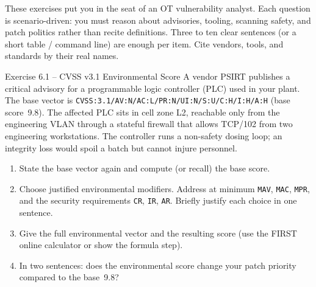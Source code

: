 \documentclass[11pt,a4paper]{article}
\begin{document}
\sheetheader

\noindent These exercises put you in the seat of an OT vulnerability analyst.
Each question is scenario-driven: you must reason about advisories, tooling,
scanning safety, and patch politics rather than recite definitions. Three to
ten clear sentences (or a short table / command line) are enough per item.
Cite vendors, tools, and standards by their real names.

\begin{taskbox}{Exercise 6.1 -- CVSS v3.1 Environmental Score}
A vendor PSIRT publishes a critical advisory for a programmable logic
controller (PLC) used in your plant. The base vector is
\texttt{CVSS:3.1/AV:N/AC:L/PR:N/UI:N/S:U/C:H/I:H/A:H} (base score~9.8).
The affected PLC sits in cell zone L2, reachable only from the engineering
VLAN through a stateful firewall that allows TCP/102 from two engineering
workstations. The controller runs a non-safety dosing loop; an integrity
loss would spoil a batch but cannot injure personnel.

\begin{enumerate}
  \item State the base vector again and compute (or recall) the base score.
  \item Choose justified environmental modifiers. Address at minimum
        \texttt{MAV}, \texttt{MAC}, \texttt{MPR}, and the security
        requirements \texttt{CR}, \texttt{IR}, \texttt{AR}. Briefly
        justify each choice in one sentence.
  \item Give the full environmental vector and the resulting score
        (use the FIRST online calculator or show the formula step).
  \item In two sentences: does the environmental score change your
        patch priority compared to the base~9.8?
\end{enumerate}
\end{taskbox}
\end{document}
